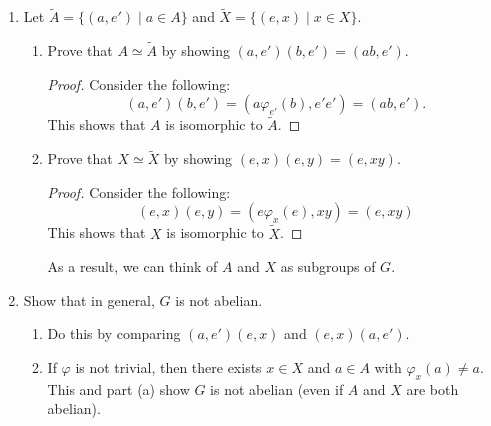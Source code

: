 \documentclass[12pt, oneside]{book}
\newenvironment{solution}{\textit{Solution.}}
\newcommand{\sol}[1]{
    \begin{customframedproof}[linecolor=orangehdx!75,]
        \begin{solution}
        #1
        \end{solution}
    \end{customframedproof}
}
\newcommand{\pf}[1]{
    \begin{customframedproof}[linecolor=orangehdx!75]
        \begin{proof}
        #1
        \end{proof}
    \end{customframedproof}
}
\begin{document}
\begin{enumerate}
{\begin{enumerate}
\begin{align*}
            &= (a\varphi_{xx^{-1}}(a^{-1}), e') \\
            &= (a\varphi_{e'}(a^{-1}), e') \\
            &= (aa^{-1}, e') \\
            &= (e,e').
        \end{align*}
        Now, for the other direction:
        \begin{align*}
            (\varphi_{x^{-1}}(a^{-1}), x^{-1})(a,x) &= (\varphi_{x^{-1}}(a^{-1})\varphi_{x^{-1}}(a), x^{-1}x) \\
            &= (\varphi_{x^{-1}}(a^{-1}a), e') \\
            &= (\varphi_{x^{-1}}(e), e') \\
            &= (e,e').
        \end{align*}
        Therefore, we have shown the identity element is \((\varphi_{x^{-1}}(a^{-1}), x^{-1}) \in G\). \qedhere
    \end{enumerate}  
    }
    \item Let \(\tilde{A} = \{(a,e') \mid a \in A\}\) and \(\tilde{X} = \{(e,x) \mid x \in X\}\).
    \begin{enumerate}
        \item Prove that \(A \simeq \tilde{A}\) by showing \((a,e')(b,e') = (ab,e')\).
        \pf{
            Consider the following:
            \[
                (a,e')(b,e') = (a\varphi_{e'}(b),e'e') = (ab,e').
            \]
            This shows that \(A\) is isomorphic to \(\tilde{A}\).
        }
        \item Prove that \(X \simeq \tilde{X}\) by showing \((e,x)(e,y) = (e,xy)\).
        \pf{
            Consider the following:
            \[
                (e,x)(e,y) = (e\varphi_{x}(e),xy) = (e,xy)
            \]
            This shows that \(X\) is isomorphic to \(\tilde{X}\).
        }
        As a result, we can think of \(A\) and \(X\) as subgroups of \(G\).
    \end{enumerate}
    \item Show that in general, \(G\) is not abelian.
        \begin{enumerate}
            \item Do this by comparing \((a,e')(e,x)\) and \((e,x)(a,e')\).
                \item If \(\varphi\) is not trivial, then there exists \(x \in X\) and \(a \in A\) with \(\varphi_{x}(a) \ne a\). This and part (a) show \(G\) is not abelian (even if \(A\) and \(X\) are both abelian).
        \end{enumerate}
    


\end{enumerate}
\end{document}
